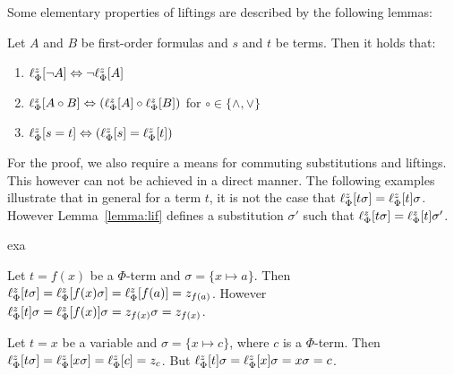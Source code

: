 Some elementary properties of liftings are described by the following lemmas:


\begin{lemma}
	\label{lemma:lift_commute}
	Let $A$ and $B$ be first-order formulas and $s$ and $t$ be terms. Then it holds that:
	\begin{enumerate}
		\item $\lift{\Phi}{\lnot A}{z} \spas\semiff{} \lnot \lift{\Phi}{A}{z}$
		\item $\lift{\Phi}{A \circ B}{z} \spas\semiff{} ( \lift{\Phi}{A}{z} \circ \lift{\Phi}{B}{z} )$ for  $\circ \in \{\land, \lor\}$
		\item $\lift{\Phi}{s = t}{z} \spas\semiff{} ( \lift{\Phi}{s}{z} = \lift{\Phi}{t}{z} )$
	\end{enumerate}
\end{lemma}

For the proof, we also require a means for commuting substitutions and liftings.
This however can not be achieved in a direct manner. The following examples illustrate
that in general for a term $t$, it is not the case that
$
\lft{\Phi}{z}{t\sigma} =
\lft{\Phi}{z}{t}\sigma 
$. However Lemma~\ref{lemma:lif} defines a substitution $\sigma'$ such that 
$
\lft{\Phi}{z}{t\sigma} =
\lft{\Phi}{z}{t}\sigma'
$.

\begin{subtheorem}{exa}
	\begin{exa}
		Let $t = f(x)$ be a $\Phi$-term and $\sigma = \{x \mapsto a\}$.
		Then $\lft{\Phi}{z}{t\sigma} = \lft{\Phi}{z}{f(x)\sigma} = \lft{\Phi}{z}{f(a)} = z_{f(a)}$.
		However $\lft{\Phi}{z}{t}\sigma = \lft{\Phi}{z}{f(x)}\sigma = z_{f(x)}\sigma = z_{f(x)}$.
	\end{exa}
	\begin{exa}
		Let $t=x$ be a variable and $\sigma = \{x\mapsto c\}$, where $c$ is a $\Phi$-term.
		Then $\lft{\Phi}{z}{t\sigma} = 
		\lft{\Phi}{z}{x\sigma} =
		\lft{\Phi}{z}{c} = z_c$.
		But 
		$\lft{\Phi}{z}{t}\sigma = 
		\lft{\Phi}{z}{x}\sigma = 
		x\sigma = 
		c$.
	\end{exa}
\end{subtheorem}


